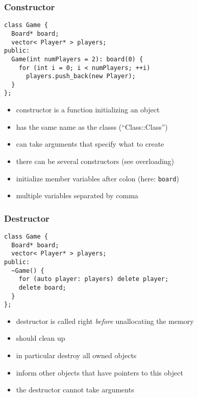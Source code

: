 \documentclass{slides}
\begin{document}
\begin{frame}[fragile]
  \frametitle{Constructor}

\begin{lstlisting}
class Game {
  Board* board;
  vector< Player* > players;
public:
  Game(int numPlayers = 2): board(0) {
    for (int i = 0; i < numPlayers; ++i)
      players.push_back(new Player);
  }
};
\end{lstlisting}

  \begin{itemize}
  \item constructor is a function initializing an object
  \item has the same name as the classs (``Class::Class'')
  \item can take arguments that specify what to create
  \item there can be several constructors (see overloading)
  \item initialize member variables after colon (here: \lstinline!board!)
  \item multiple variables separated by comma
  \end{itemize}
\end{frame}

\begin{frame}[fragile]
  \frametitle{Destructor}

\begin{lstlisting}
class Game {
  Board* board;
  vector< Player* > players;
public:
  ~Game() {
    for (auto player: players) delete player;
    delete board;
  }
};
\end{lstlisting}

  \begin{itemize}
  \item destructor is called right \emph{before} unallocating the
    memory
  \item should clean up
  \item in particular destroy all owned objects
  \item inform other objects that have pointers to this object
  \item the destructor cannot take arguments
  \end{itemize}
\end{frame}
\end{document}
